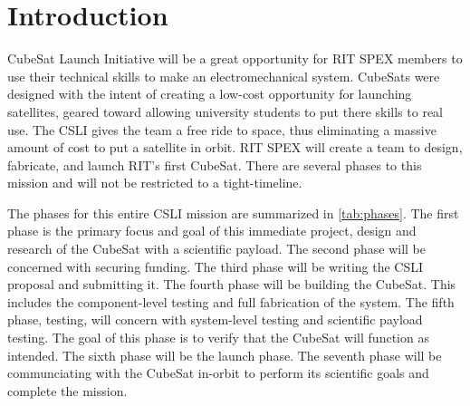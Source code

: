 \documentclass[conference]{IEEEtran} %
\begin{document}

\section{Introduction}
\label{sec:introduction}
 CubeSat Launch Initiative will be a great opportunity for RIT SPEX members to use their technical skills to make an electromechanical system.
CubeSats were designed with the intent of creating a low-cost opportunity for launching satellites, geared toward allowing university students to put there skills to
real use. The CSLI gives the team a free ride to space, thus eliminating a massive amount of cost to put a satellite in orbit. RIT SPEX will create a team
to design, fabricate, and launch RIT's first CubeSat. There are several phases to this mission and will not be restricted to a tight-timeline.

The phases for this entire CSLI mission are summarized in \autoref{tab:phases}. The first phase is the primary focus and goal of this immediate project, design and
research of the CubeSat with a scientific payload. The second phase will be concerned with securing funding. The third phase will be writing the CSLI proposal and submitting it.
The fourth phase will be building the CubeSat. This includes the component-level testing and full fabrication of the system. The fifth phase, testing, will concern with system-level
testing and scientific payload testing. The goal of this phase is to verify that the CubeSat will function as intended. The sixth phase will be the launch phase. The seventh phase
will be communciating with the CubeSat in-orbit to perform its scientific goals and complete the mission.
\end{document}
